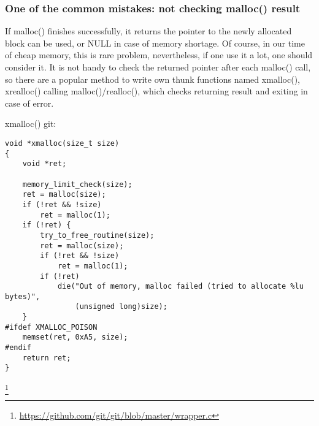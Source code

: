 
\subsubsection{
{One of the common mistakes: not checking malloc() result}}

{If malloc() finishes successfully, it returns the pointer to the newly allocated block can be used,
or NULL in case of memory shortage}.
{Of course, in our time of cheap memory, this is rare problem, nevertheless, if one use it a lot,
one should consider it}.
{It is not handy to check the returned pointer after each malloc() call, so there are a popular method
to write own thunk functions named xmalloc(), xrealloc() calling malloc()/realloc(), which checks
returning result and exiting in case of error}.

 xmalloc()  git:

\begin{lstlisting}
void *xmalloc(size_t size)
{
	void *ret;

	memory_limit_check(size);
	ret = malloc(size);
	if (!ret && !size)
		ret = malloc(1);
	if (!ret) {
		try_to_free_routine(size);
		ret = malloc(size);
		if (!ret && !size)
			ret = malloc(1);
		if (!ret)
			die("Out of memory, malloc failed (tried to allocate %lu bytes)",
			    (unsigned long)size);
	}
#ifdef XMALLOC_POISON
	memset(ret, 0xA5, size);
#endif
	return ret;
}
\end{lstlisting}
\footnote{\url{https://github.com/git/git/blob/master/wrapper.c}}

